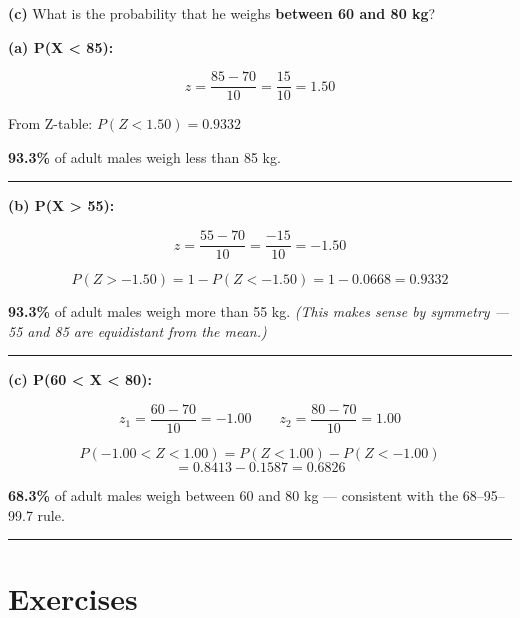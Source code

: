 \documentclass[
  12pt,
  letterpaper,
]{book}
\begin{document}
\textbf{(c)} What is the probability that he weighs \textbf{between 60
and 80 kg}?

\begin{tcolorbox}[enhanced jigsaw, arc=.35mm, bottomrule=.15mm, bottomtitle=1mm, breakable, colback=white, colbacktitle=quarto-callout-tip-color!10!white, colframe=quarto-callout-tip-color-frame, coltitle=black, left=2mm, leftrule=.75mm, opacityback=0, opacitybacktitle=0.6, rightrule=.15mm, title={✅ Solution}, titlerule=0mm, toprule=.15mm, toptitle=1mm]

\textbf{(a) P(X \textless{} 85):}

\[z = \frac{85 - 70}{10} = \frac{15}{10} = 1.50\]

From Z-table: \(P(Z < 1.50) = \mathbf{0.9332}\)

\textbf{93.3\%} of adult males weigh less than 85 kg.

\begin{center}\rule{0.5\linewidth}{0.5pt}\end{center}

\textbf{(b) P(X \textgreater{} 55):}

\[z = \frac{55 - 70}{10} = \frac{-15}{10} = -1.50\]

\[P(Z > -1.50) = 1 - P(Z < -1.50) = 1 - 0.0668 = \mathbf{0.9332}\]

\textbf{93.3\%} of adult males weigh more than 55 kg. \emph{(This makes
sense by symmetry --- 55 and 85 are equidistant from the mean.)}

\begin{center}\rule{0.5\linewidth}{0.5pt}\end{center}

\textbf{(c) P(60 \textless{} X \textless{} 80):}

\[z_1 = \frac{60 - 70}{10} = -1.00 \qquad z_2 = \frac{80 - 70}{10} = 1.00\]

\[P(-1.00 < Z < 1.00) = P(Z < 1.00) - P(Z < -1.00)\]
\[= 0.8413 - 0.1587 = \mathbf{0.6826}\]

\textbf{68.3\%} of adult males weigh between 60 and 80 kg --- consistent
with the 68--95--99.7 rule.

\end{tcolorbox}

\begin{center}\rule{0.5\linewidth}{0.5pt}\end{center}


\chapter{Exercises}\label{exercises-2}
\end{document}
